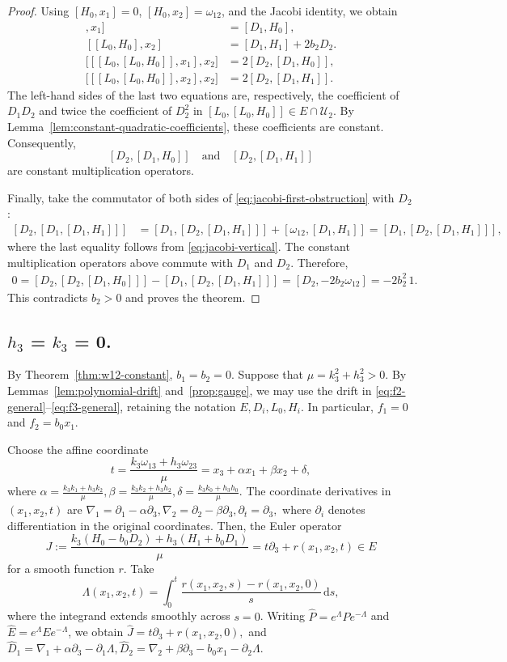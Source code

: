 \documentclass{tCON2e}
\newenvironment{revision}{\begingroup\color{black}}{\endgroup}
\numberwithin{equation}{section}
\theoremstyle{journalplain}
\theoremstyle{journaldef}
\newenvironment{revision}{}{}
\begin{document}
\begin{revision}
\begin{proof}
Using $[H_0,x_1]=0$, $[H_0,x_2]=\omega_{12}$, and the
Jacobi identity, we obtain
\begin{align*}
[[L_0,H_0],x_1]&=[D_1,H_0],\\
[[L_0,H_0],x_2]&=[D_1,H_1]+2b_2D_2.\\
\bigl[[[L_0,[L_0,H_0]],x_1],x_2\bigr]
&=2[D_2,[D_1,H_0]],\\
\bigl[[[L_0,[L_0,H_0]],x_2],x_2\bigr]
&=2[D_2,[D_1,H_1]].
\label{eq:jacobi-head-extraction}
\end{align*}
The left-hand sides of the last two equations are, respectively, the coefficient
of $D_1D_2$ and twice the coefficient of $D_2^2$ in
$[L_0,[L_0,H_0]] \in E\cap\mathcal U_2$.
By Lemma~\ref{lem:constant-quadratic-coefficients},
these coefficients are constant. Consequently,
\[
[D_2,[D_1,H_0]]
\quad\text{and}\quad
[D_2,[D_1,H_1]]
\]
are constant multiplication operators.

Finally, take the commutator of both sides of
\eqref{eq:jacobi-first-obstruction} with $D_2$:
\[
\begin{aligned}
{}[D_2,[D_1,[D_1,H_1]]]
&=[D_1,[D_2,[D_1,H_1]]]
  +[\omega_{12},[D_1,H_1]]=[D_1,[D_2,[D_1,H_1]]],
\end{aligned}
\]
where the last equality follows from
\eqref{eq:jacobi-vertical}.
The constant multiplication operators above commute
with $D_1$ and $D_2$. Therefore,
\[
\begin{aligned}
0=[D_2,[D_2,[D_1,H_0]]]
  -[D_1,[D_2,[D_1,H_1]]]=[D_2,-2b_2\omega_{12}]
=-2b_2^2\,1.
\end{aligned}
\]
This contradicts $b_2>0$ and proves the theorem.
\end{proof}


\subsection{$h_3$ = $k_3$ = 0.}

By Theorem~\ref{thm:w12-constant}, $b_1=b_2=0$.
Suppose that $\mu=k_3^2+h_3^2>0$.
By Lemmas~\ref{lem:polynomial-drift} and~\ref{prop:gauge},
we may use the drift in
\eqref{eq:f2-general}--\eqref{eq:f3-general}, retaining
the notation $E,D_i,L_0,H_i$. In particular,
$f_1=0$ and $f_2=b_0x_1$.

Choose the affine coordinate
\[
t=\frac{k_3\omega_{13}+h_3\omega_{23}}{\mu}
=x_3+\alpha x_1+\beta x_2+\delta,
\]
where
\(
\alpha=\frac{k_3k_1+h_3k_2}{\mu},
\beta=\frac{k_3k_2+h_3h_2}{\mu},
\delta=\frac{k_3k_0+h_3h_0}{\mu}.
\)
The coordinate derivatives in $(x_1,x_2,t)$ are
\(
\nabla_1=\partial_1-\alpha\partial_3,
\nabla_2=\partial_2-\beta\partial_3,
\partial_t=\partial_3,
\)
where $\partial_i$ denotes differentiation in the original
coordinates. Then, the Euler operator
\[
J:=\frac{k_3(H_0-b_0D_2)+h_3(H_1+b_0D_1)}{\mu}
=t\partial_3+r(x_1,x_2,t)\in E
\]
for a smooth function $r$.
Take
\[
\Lambda(x_1,x_2,t)
=\int_0^t
\frac{r(x_1,x_2,s)-r(x_1,x_2,0)}{s}\,\mathrm ds,
\]
where the integrand extends smoothly across $s=0$.
Writing $\widehat P=e^\Lambda Pe^{-\Lambda}$ and
$\widehat E=e^\Lambda Ee^{-\Lambda}$, we obtain
\(
\widehat J=t\partial_3+r(x_1,x_2,0),
\)
and
\(
\widehat D_1
=\nabla_1+\alpha\partial_3-\partial_1\Lambda,
\widehat D_2
=\nabla_2+\beta\partial_3-b_0x_1-\partial_2\Lambda.
\)


\end{revision}
\end{document}
